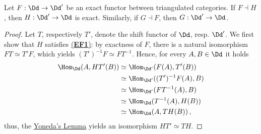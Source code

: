 % 

\begin{prop}\label{adj-exact}
    Let $F:\Dd \to \Dd'$ be an exact functor 
    between triangulated categories.
    If $F \dashv H$, then $H: \Dd' \to \Dd$ is exact.
    Similarly, if $G \dashv F$, then $G: \Dd' \to \Dd$.
    \begin{proof}
        Let $T$, respectively $T'$, denote the shift functor
        of $\Dd$, resp. $\Dd'$. We first show that $H$
        satisfies \hyperref[EF1]{(\textbf{EF1})}: 
        by exactness of $F$, there is a natural isomorphism
        $FT \simeq T'F$, which yields $(T')^{-1}F \simeq FT^{-1}$.
        Hence, for every $A, B \in \Dd$
        it holds
        \begin{align*}
            \Hom_{\Dd}(A,HT'(B))
            &\simeq \Hom_{\Dd'}(F(A),T'(B)) \\
            &\simeq \Hom_{\Dd'}((T')^{-1}F(A),B) \\
            &\simeq \Hom_{\Dd'}(FT^{-1}(A),B) \\
            &\simeq \Hom_{\Dd}(T^{-1}(A),H(B)) \\
            &\simeq \Hom_{\Dd}(A,TH(B))\,,
        \end{align*}
        thus, the \hyperref[yoneda]{Yoneda's Lemma}
        yields an isomorphism $HT' \simeq TH$.


\end{proof}
\end{prop}
